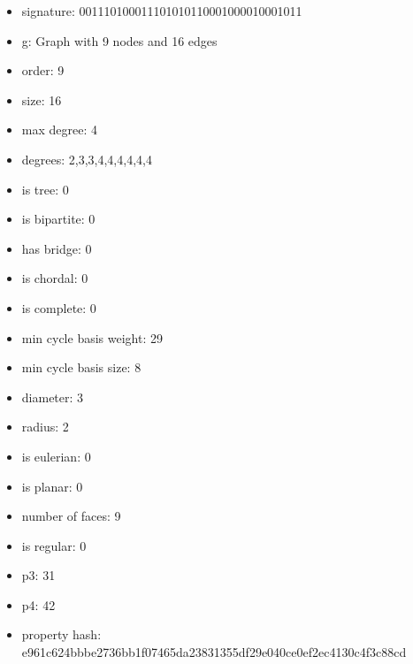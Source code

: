 \newpage
\begin{figure}
\end{figure}
\begin{itemize}
\item signature: 001110100011101010110001000010001011
\item g: Graph with 9 nodes and 16 edges
\item order: 9
\item size: 16
\item max degree: 4
\item degrees: 2,3,3,4,4,4,4,4,4
\item is tree: 0
\item is bipartite: 0
\item has bridge: 0
\item is chordal: 0
\item is complete: 0
\item min cycle basis weight: 29
\item min cycle basis size: 8
\item diameter: 3
\item radius: 2
\item is eulerian: 0
\item is planar: 0
\item number of faces: 9
\item is regular: 0
\item p3: 31
\item p4: 42
\item property hash: e961c624bbbe2736bb1f07465da23831355df29e040ce0ef2ec4130c4f3c88cd
\end{itemize}
